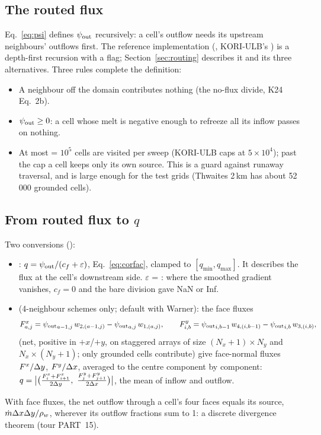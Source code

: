 \subsection{The routed flux}\label{disc:psi}
Eq.~\eqref{eq:psi} defines ${\psi_{\rm out}}$ recursively: a cell's outflow needs its upstream neighbours' outflows first.
The reference implementation (, KORI-ULB's ) is a depth-first
recursion with a  flag; Section~\ref{sec:routing} describes it and its three alternatives. Three rules
complete the definition:
\begin{itemize}[leftmargin=1.5em]
\item A neighbour off the domain contributes nothing (the no-flux divide, K24 Eq.~2b).
\item ${\psi_{\rm out}}\ge0$: a cell whose melt is negative enough to refreeze all its inflow passes on nothing.
\item At most  = $10^5$ cells are visited per sweep (KORI-ULB caps at $5\times10^4$); past the cap
  a cell keeps only its own source. This is a guard against runaway traversal, and is large enough for the test
  grids (Thwaites 2\,km has about 52\,000 grounded cells).
\end{itemize}

\subsection{From routed flux to $q$}\label{disc:qconv}
Two conversions ():
\begin{itemize}[leftmargin=1.5em]
\item {}: $q = {\psi_{\rm out}}/(c_f + \varepsilon)$, Eq.~\eqref{eq:corfac}, clamped to $[q_{\min}, q_{\max}]$. It
  describes the flux at the cell's downstream side. $\varepsilon$ = : where the smoothed gradient vanishes,
  $c_f = 0$ and the bare division gave NaN or Inf.
\item {} (4-neighbour schemes only; default with Warner): the face fluxes
  \begin{equation}
  F^x_{a,j} = {\psi_{\rm out}}_{a-1,j}\,w_{2,(a-1,j)} - {\psi_{\rm out}}_{a,j}\,w_{1,(a,j)},\qquad
  F^y_{i,b} = {\psi_{\rm out}}_{i,b-1}\,w_{4,(i,b-1)} - {\psi_{\rm out}}_{i,b}\,w_{3,(i,b)},
  \end{equation}
  (net, positive in $+x$/$+y$, on staggered arrays of size $(N_x{+}1)\times N_y$ and $N_x\times(N_y{+}1)$; only grounded
  cells contribute) give face-normal fluxes $F^x/\Delta y$, $F^y/\Delta x$, averaged to the centre component by component:
  $q = \bigl|\bigl(\tfrac{F^x_{i}+F^x_{i+1}}{2\Dy},\ \tfrac{F^y_{j}+F^y_{j+1}}{2\Dx}\bigr)\bigr|$, the mean of inflow and outflow.
\end{itemize}
With face fluxes, the net outflow through a cell's four faces equals its source, $\dot m\Delta x\Delta y/{\rho_w}$, wherever its
outflow fractions sum to 1: a discrete divergence theorem (tour PART~15).


